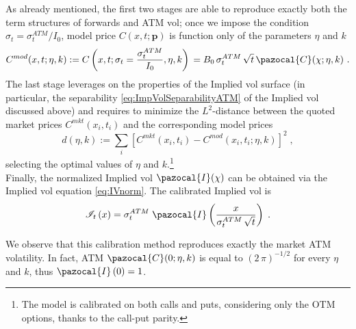 \documentclass[12pt]{article}
\newcommand{\Ib}{\pazocal{I}}
\newcommand{\Cb}{\pazocal{C}}
\theoremstyle{definition}
\theoremstyle{remark}
\numberwithin{theorem}{section}
\numberwithin{proposition}{section}
\numberwithin{lemma}{section}
\numberwithin{corollary}{section}
\numberwithin{definition}{section}
\numberwithin{remark}{section}
\numberwithin{example}{section}
\begin{document}
As already mentioned, the first two stages are able to reproduce exactly both the term structures of forwards and ATM vol; once we impose the condition $\sigma_t=\sigma_t^{ATM}/I_0$, model price $C(x,t;\mathbf{p})$ is function only of the parameters $\eta$ and $k$ \begin{equation*}
\displaystyle C^{mod}(x,t;\eta,k):=C\left(x,t;\sigma_t=\frac{\sigma_t^{ATM}}{I_0},\eta,k\right)\,=B_0\,\sigma_t^{ATM}\,\sqrt{t}\,\Cb ({\chi}; \eta, k) \,\,.
\end{equation*}
The last stage leverages on the properties of the Implied vol surface (in particular, the separability 
\eqref{eq:ImpVolSeparabilityATM}
of the Implied vol discussed above) and requires to 
minimize the $L^2$-distance between the quoted market prices $C^{mkt}(x_i,t_i)$ and the corresponding model prices
\[
d(\eta, k) := \sum_{i}\left[ C^{mkt} (x_i,t_i) - C^{mod}(x_i,t_i; \eta, k)\right]^2 \; ,
\]
selecting the optimal values of $\eta$ and 
$k$.\footnote{The model is calibrated on both calls and puts, considering only the OTM options, thanks to the call-put parity.}\\
Finally, the normalized Implied vol $\Ib({\chi} )$ can be obtained via the Implied vol equation \eqref{eq:IVnorm}. 
The calibrated Implied vol is 
\[
{\cal I}_t\left( {x} \right) = \sigma^{ATM}_t \; \Ib \left( \frac{x}{\sigma^{ATM}_t \, \sqrt{t} } \right) \; .
\]

We observe that this calibration method reproduces exactly the market ATM volatility. 
In fact, ATM $\Cb(0; \eta, k)$ is equal to $(2 \, \pi)^{-1/2}$ for every $\eta$ and $k$, 
thus $\Ib \left( 0 \right) =1$.


\bigskip

\end{document}
